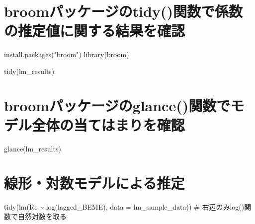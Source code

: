 \documentclass[
  letterpaper,
  DIV=11,
  numbers=noendperiod]{scrreprt}
\newenvironment{Shaded}{\begin{snugshade}}{\end{snugshade}}
\newcommand{\AttributeTok}[1]{\textcolor[rgb]{0.40,0.45,0.13}{#1}}
\newcommand{\CommentTok}[1]{\textcolor[rgb]{0.37,0.37,0.37}{#1}}
\newcommand{\DocumentationTok}[1]{\textcolor[rgb]{0.37,0.37,0.37}{\textit{#1}}}
\newcommand{\FunctionTok}[1]{\textcolor[rgb]{0.28,0.35,0.67}{#1}}
\newcommand{\NormalTok}[1]{\textcolor[rgb]{0.00,0.23,0.31}{#1}}
\newcommand{\SpecialCharTok}[1]{\textcolor[rgb]{0.37,0.37,0.37}{#1}}
\newcommand{\StringTok}[1]{\textcolor[rgb]{0.13,0.47,0.30}{#1}}
\begin{document}
\begin{Shaded}
\end{Shaded}

\section{broomパッケージのtidy()関数で係数の推定値に関する結果を確認}\label{broomux30d1ux30c3ux30b1ux30fcux30b8ux306etidyux95a2ux6570ux3067ux4fc2ux6570ux306eux63a8ux5b9aux5024ux306bux95a2ux3059ux308bux7d50ux679cux3092ux78baux8a8d}

\begin{Shaded}
\begin{Highlighting}[]
\FunctionTok{install.packages}\NormalTok{(}\StringTok{"broom"}\NormalTok{)}
\FunctionTok{library}\NormalTok{(broom)}

\FunctionTok{tidy}\NormalTok{(lm\_results)}
\end{Highlighting}
\end{Shaded}

\section{broomパッケージのglance()関数でモデル全体の当てはまりを確認}\label{broomux30d1ux30c3ux30b1ux30fcux30b8ux306eglanceux95a2ux6570ux3067ux30e2ux30c7ux30ebux5168ux4f53ux306eux5f53ux3066ux306fux307eux308aux3092ux78baux8a8d}

\begin{Shaded}
\begin{Highlighting}[]
\FunctionTok{glance}\NormalTok{(lm\_results)}
\end{Highlighting}
\end{Shaded}

\section{線形・対数モデルによる推定}\label{ux7ddaux5f62ux5bfeux6570ux30e2ux30c7ux30ebux306bux3088ux308bux63a8ux5b9a}

\begin{Shaded}
\begin{Highlighting}[]
\FunctionTok{tidy}\NormalTok{(}\FunctionTok{lm}\NormalTok{(Re }\SpecialCharTok{\textasciitilde{}} \FunctionTok{log}\NormalTok{(lagged\_BEME), }\AttributeTok{data =}\NormalTok{ lm\_sample\_data)) }\CommentTok{\# 右辺のみlog()関数で自然対数を取る}
\end{Highlighting}
\end{Shaded}
\end{document}
